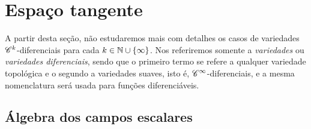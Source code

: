 \section{Espaço tangente}

A partir desta seção, não estudaremos mais com detalhes os casos de variedades $\mathscr{C}^k$-diferenciais para cada $k \in \mathbb{N} \cup \{\infty\}$. Nos referiremos somente a \emph{variedades} ou \emph{variedades diferenciais}, sendo que o primeiro termo se refere a qualquer variedade topológica e o segundo a variedades suaves, isto é, $\mathscr{C}^\infty$-diferenciais, e a mesma nomenclatura será usada para funções diferenciáveis.

\subsection{Álgebra dos campos escalares}

